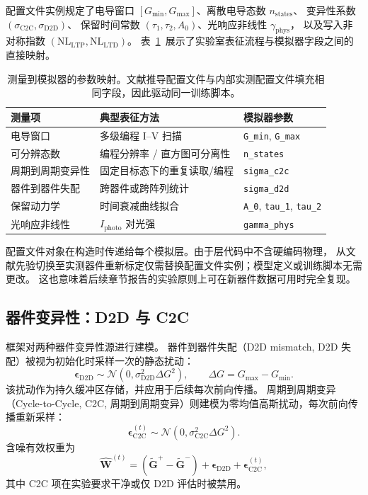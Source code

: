 配置文件实例规定了电导窗口 $[G_{\min}, G_{\max}]$、离散电导态数 $n_{\text{states}}$、
变异性系数 $(\sigma_{\text{C2C}}, \sigma_{\text{D2D}})$、
保留时间常数 $(\tau_1, \tau_2, A_0)$、光响应非线性 $\gamma_{\text{phys}}$，
以及写入非对称指数 $(\mathrm{NL}_{\mathrm{LTP}}, \mathrm{NL}_{\mathrm{LTD}})$。
表~\ref{tab:measurement-mapping}~展示了实验室表征流程与模拟器字段之间的直接映射。

\begin{table}[htbp]
\centering
\caption{测量到模拟器的参数映射。文献推导配置文件与内部实测配置文件填充相同字段，因此驱动同一训练脚本。}
\label{tab:measurement-mapping}
\begin{tabular}{lll}
\toprule
\textbf{测量项} & \textbf{典型表征方法} & \textbf{模拟器参数} \\
\midrule
电导窗口 & 多级编程 I--V 扫描 & \texttt{G\_min}, \texttt{G\_max} \\
可分辨态数 & 编程分辨率 / 直方图可分离性 & \texttt{n\_states} \\
周期到周期变异性 & 固定目标态下的重复读取/编程 & \texttt{sigma\_c2c} \\
器件到器件失配 & 跨器件或跨阵列统计 & \texttt{sigma\_d2d} \\
保留动力学 & 时间衰减曲线拟合 & \texttt{A\_0}, \texttt{tau\_1}, \texttt{tau\_2} \\
光响应非线性 & $I_{\text{photo}}$ 对光强 & \texttt{gamma\_phys} \\
\bottomrule
\end{tabular}
\end{table}

配置文件对象在构造时传递给每个模拟层。由于层代码中不含硬编码物理，
从文献先验切换至实测器件重新标定仅需替换配置文件实例；模型定义或训练脚本无需更改。
这也意味着后续章节报告的实验原则上可在新器件数据可用时完全复现。

\subsection{器件变异性：D2D 与 C2C}

框架对两种器件变异性源进行建模。
器件到器件失配（D2D mismatch, D2D 失配）被视为初始化时采样一次的静态扰动：
\begin{equation}
\boldsymbol{\epsilon}_{\text{D2D}} \sim \mathcal{N}\left(0, \sigma_{\text{D2D}}^{2} \Delta G^{2}\right), \qquad \Delta G = G_{\max} - G_{\min}.
\label{eq:d2d-model}
\end{equation}
该扰动作为持久缓冲区存储，并应用于后续每次前向传播。
周期到周期变异（Cycle-to-Cycle, C2C, 周期到周期变异）则建模为零均值高斯扰动，每次前向传播重新采样：
\begin{equation}
\boldsymbol{\epsilon}_{\text{C2C}}^{(t)} \sim \mathcal{N}\left(0, \sigma_{\text{C2C}}^{2} \Delta G^{2}\right).
\label{eq:c2c-model}
\end{equation}
含噪有效权重为
\begin{equation}
\widehat{\mathbf{W}}^{(t)} = \left(\widetilde{\mathbf{G}}^{+} - \widetilde{\mathbf{G}}^{-}\right) + \boldsymbol{\epsilon}_{\text{D2D}} + \boldsymbol{\epsilon}_{\text{C2C}}^{(t)},
\label{eq:noisy-weight}
\end{equation}
其中 C2C 项在实验要求干净或仅 D2D 评估时被禁用。

